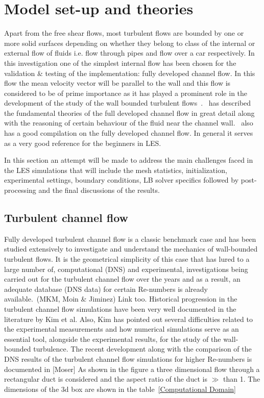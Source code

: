 \newpage

\section{Model set-up and theories}

Apart from the free shear flows, most turbulent flows are bounded by one or more solid surfaces depending on whether they belong to class of the internal or external flow of fluids i.e. flow through pipes and flow over a car respectively.  In this investigation one of the simplest internal flow has been chosen for the validation \& testing of the implementation: fully developed channel flow. In this flow the mean velocity vector will be parallel to the wall and this flow is considered to be of prime importance as it has played a prominent role in the development of the study of the wall bounded turbulent flows~\cite{pope:book}.~\cite{pope:book} has described the fundamental theories of the full developed channel flow in great detail along with the reasoning of certain behaviour of the fluid near the channel wall.~\cite{froehlich:book} also has a good compilation on the fully developed channel flow. In general it serves as a very good reference for the beginners in LES.

In this section an attempt will be made to address the main challenges faced in the LES simulations that will include the mesh statistics, initialization, experimental settings, boundary conditions, LB solver specifics followed by post-processing and the final discussions of the results. 

\subsection{Turbulent channel flow}

Fully developed turbulent channel flow is a classic benchmark case and has been studied extensively to investigate and understand the mechanics of wall-bounded turbulent flows. It is the geometrical simplicity of this case that has lured to a large number of, computational (DNS) and experimental, investigations being carried out for the turbulent channel flow over the years and as a result, an adequate database (DNS data) for certain Re-numbers is already available.~\cite{channeldata:99}(MKM, Moin \& Jiminez) Link too. Historical progression in the turbulent channel flow simulations have been very well documented in the literature by Kim et al. Also, Kim has pointed out several difficulties related to the experimental measurements and how numerical simulations serve as an essential tool, alongside the experimental results, for the study of the wall-bounded turbulence. The recent development along with the comparison of the DNS results of the turbulent channel flow simulations for higher Re-numbers is documented in [Moser]
As shown in the figure a three dimensional flow through a rectangular duct is considered and the aspect ratio of the duct is $\gg$ than 1.
The dimensions of the 3d box are shown in the table~\ref{Computational Domain}

